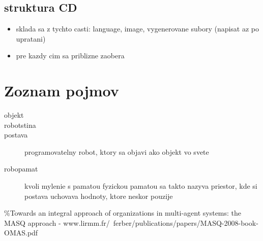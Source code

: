 \documentclass[a4paper,11pt,final]{report}
\begin{document}
\section{struktura CD}
\begin{itemize}
\item sklada sa z tychto casti: language, image, vygenerovane subory (napisat az po upratani)
\item pre kazdy cim sa priblizne zaobera
\end{itemize}
\chapter{Zoznam pojmov}
\begin{description}
\item[objekt]
\item[robotstina]
\item[postava]
programovatelny robot, ktory sa objavi ako objekt vo svete
\item[robopamat]
        kvoli mylenie s pamatou fyzickou pamatou sa takto nazyva priestor, kde si postava uchovava hodnoty, ktore neskor pouzije
\end{description}
\%Towards an integral approach of organizations in multi-agent systems: the MASQ approach - www.lirmm.fr/~ferber/publications/papers/MASQ-2008-book-OMAS.pdf
\end{document}
